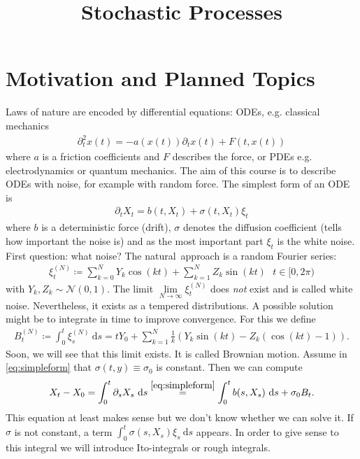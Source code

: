 \documentclass[10pt,a4paper]{report}
\title{Stochastic Processes}
\begin{document}
\maketitle
\chapter*{Motivation and Planned Topics}
Laws of nature are encoded by differential equations: ODEs, e.g. classical mechanics 
\begin{align*}
\partial_t^2 x(t)=-a(x(t))\partial_t x(t)+F(t,x(t))
\end{align*}
where $a$ is a friction coefficients and $F$ describes the force,
or PDEs e.g. electrodynamics or quantum mechanics.
The aim of this course is to describe ODEs with noise, for example with random force.
The simplest form of an ODE is
\begin{align}\label{eq:simpleform}
\partial_t X_t=b(t,X_t)+\sigma(t,X_t)\xi_t
\end{align}
where $b$ is a deterministic force (drift), $\sigma$ denotes the diffusion coefficient (tells how important the noise is) and as the most important part
$\xi_t$ is the white noise.
First question: what noise?
The \glqq natural\grqq\, approach is a random Fourier series:
\begin{align}
\xi_t^{(N)}\coloneqq \sum_{k=0}^N Y_k \cos(kt)+ \sum_{k=1}^N Z_k \sin(kt)~~~t\in [0,2\pi)
\end{align}
with $Y_k,Z_k \sim \mathcal{N}(0,1)$.
The limit $\lim\limits_{N\to \infty} \xi_t^{(N)}$ does \emph{not} exist and is called \glqq white noise\grqq.
Nevertheless, it exists as a tempered distributions.
A possible solution might be to integrate in time to improve convergence. For this we define
\begin{align}
B_t^{(N)}\coloneqq \int_0^t\xi_s^{(N)}~\mathrm{d}s=tY_0+\sum_{k=1}^N \frac{1}{k}(Y_k\sin(kt)-Z_k(\cos(kt)-1)).
\end{align}
Soon, we will see that this limit exists. It is called \glqq Brownian motion\grqq.
Assume in \eqref{eq:simpleform} that $\sigma(t,y)\equiv \sigma_0$ is constant. Then we can compute
\begin{align*}
X_t-X_0=\int_0^t \partial_s X_s~\mathrm{d}s\overset{\eqref{eq:simpleform}}{=}\int_0^t b(s,X_s)~\mathrm{d}s+\sigma_0 B_t.
\end{align*}
This equation at least makes sense but we don't know whether we can solve it.
If $\sigma$ is not constant, a term $\int_0^t\sigma(s,X_s)\xi_s~\mathrm{d}s$ appears.
In order to give sense to this integral we will introduce Ito-integrals or rough integrals.
\end{document}
